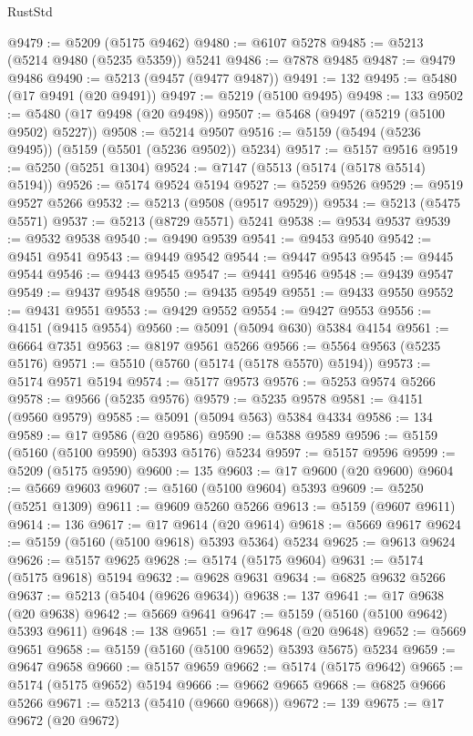 \begin{lexlean}{RustStd}
\begin{coremodule}
@9479 := @5209 (@5175 @9462)
@9480 := @6107 @5278
@9485 := @5213 (@5214 @9480 (@5235 @5359)) @5241
@9486 := @7878 @9485
@9487 := @9479 @9486
@9490 := @5213 (@9457 (@9477 @9487))
@9491 := 132
@9495 := @5480 (@17 @9491 (@20 @9491))
@9497 := @5219 (@5100 @9495)
@9498 := 133
@9502 := @5480 (@17 @9498 (@20 @9498))
@9507 := @5468 (@9497 (@5219 (@5100 @9502) @5227))
@9508 := @5214 @9507
@9516 := @5159 (@5494 (@5236 @9495)) (@5159 (@5501 (@5236 @9502)) @5234)
@9517 := @5157 @9516
@9519 := @5250 (@5251 @1304)
@9524 := @7147 (@5513 (@5174 (@5178 @5514) @5194))
@9526 := @5174 @9524 @5194
@9527 := @5259 @9526
@9529 := @9519 @9527 @5266
@9532 := @5213 (@9508 (@9517 @9529))
@9534 := @5213 (@5475 @5571)
@9537 := @5213 (@8729 @5571) @5241
@9538 := @9534 @9537
@9539 := @9532 @9538
@9540 := @9490 @9539
@9541 := @9453 @9540
@9542 := @9451 @9541
@9543 := @9449 @9542
@9544 := @9447 @9543
@9545 := @9445 @9544
@9546 := @9443 @9545
@9547 := @9441 @9546
@9548 := @9439 @9547
@9549 := @9437 @9548
@9550 := @9435 @9549
@9551 := @9433 @9550
@9552 := @9431 @9551
@9553 := @9429 @9552
@9554 := @9427 @9553
@9556 := @4151 (@9415 @9554)
@9560 := @5091 (@5094 @630) @5384 @4154
@9561 := @6664 @7351
@9563 := @8197 @9561 @5266
@9566 := @5564 @9563 (@5235 @5176)
@9571 := @5510 (@5760 (@5174 (@5178 @5570) @5194))
@9573 := @5174 @9571 @5194
@9574 := @5177 @9573
@9576 := @5253 @9574 @5266
@9578 := @9566 (@5235 @9576)
@9579 := @5235 @9578
@9581 := @4151 (@9560 @9579)
@9585 := @5091 (@5094 @563) @5384 @4334
@9586 := 134
@9589 := @17 @9586 (@20 @9586)
@9590 := @5388 @9589
@9596 := @5159 (@5160 (@5100 @9590) @5393 @5176) @5234
@9597 := @5157 @9596
@9599 := @5209 (@5175 @9590)
@9600 := 135
@9603 := @17 @9600 (@20 @9600)
@9604 := @5669 @9603
@9607 := @5160 (@5100 @9604) @5393
@9609 := @5250 (@5251 @1309)
@9611 := @9609 @5260 @5266
@9613 := @5159 (@9607 @9611)
@9614 := 136
@9617 := @17 @9614 (@20 @9614)
@9618 := @5669 @9617
@9624 := @5159 (@5160 (@5100 @9618) @5393 @5364) @5234
@9625 := @9613 @9624
@9626 := @5157 @9625
@9628 := @5174 (@5175 @9604)
@9631 := @5174 (@5175 @9618) @5194
@9632 := @9628 @9631
@9634 := @6825 @9632 @5266
@9637 := @5213 (@5404 (@9626 @9634))
@9638 := 137
@9641 := @17 @9638 (@20 @9638)
@9642 := @5669 @9641
@9647 := @5159 (@5160 (@5100 @9642) @5393 @9611)
@9648 := 138
@9651 := @17 @9648 (@20 @9648)
@9652 := @5669 @9651
@9658 := @5159 (@5160 (@5100 @9652) @5393 @5675) @5234
@9659 := @9647 @9658
@9660 := @5157 @9659
@9662 := @5174 (@5175 @9642)
@9665 := @5174 (@5175 @9652) @5194
@9666 := @9662 @9665
@9668 := @6825 @9666 @5266
@9671 := @5213 (@5410 (@9660 @9668))
@9672 := 139
@9675 := @17 @9672 (@20 @9672)

\end{coremodule}
\end{lexlean}
